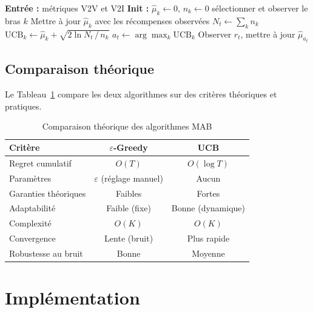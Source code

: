 \documentclass[12pt,a4paper]{article}
\begin{document}
\begin{algorithm}[H]
\caption{UCB pour la sélection V2V/V2I}
\label{alg:ucb}
\begin{algorithmic}[1]
\State \textbf{Entrée :} métriques V2V et V2I
\State \textbf{Init :} $\hat{\mu}_k \leftarrow 0$, $n_k \leftarrow 0$
   \State sélectionner et observer le bras $k$ \EndIf
\EndFor
\State Mettre à jour $\hat{\mu}_k$ avec les récompenses observées
  \State $N_t \leftarrow \sum_k n_k$
    \State $\text{UCB}_k \leftarrow \hat{\mu}_k +
           \sqrt{2 \ln N_t \,/\, n_k}$
  \EndFor
  \State $a_t \leftarrow \arg\max_k \text{UCB}_k$
  \State Observer $r_t$, mettre à jour $\hat{\mu}_{a_t}$
\EndFor
\end{algorithmic}
\end{algorithm}

\subsection{Comparaison théorique}

Le Tableau~\ref{tab:mab_comp} compare les deux algorithmes sur des critères
théoriques et pratiques.

\begin{table}[H]
\centering
\caption{Comparaison théorique des algorithmes MAB}
\label{tab:mab_comp}
\begin{tabular}{@{}lcc@{}}
\toprule
\textbf{Critère} & \textbf{$\varepsilon$-Greedy} & \textbf{UCB} \\
\midrule
Regret cumulatif & $O(T)$ & $O(\log T)$ \\
Paramètres       & $\varepsilon$ (réglage manuel) & Aucun \\
Garanties théoriques & Faibles & Fortes \\
Adaptabilité     & Faible (fixe) & Bonne (dynamique) \\
Complexité       & $O(K)$ & $O(K)$ \\
Convergence      & Lente (bruit) & Plus rapide \\
Robustesse au bruit & Bonne & Moyenne \\
\bottomrule
\end{tabular}
\end{table}

\section{Implémentation}
\label{sec:implementation}
\end{document}
